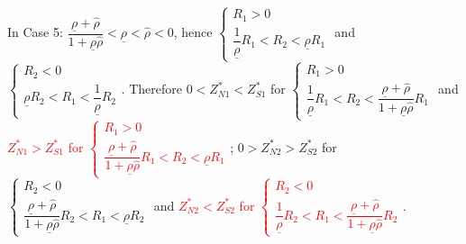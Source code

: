 \documentclass[10pt]{article}
\newcommand{\hhred}{\textcolor{red}}
\begin{document}
In Case 5: $ \dfrac{\underline{\rho} + {\hat \rho}}{1 + \underline{\rho} {\hat \rho}} < \underline{\rho} < {\hat \rho} < 0 $, hence $ \left\{ \begin{matrix} R_1 > 0 \\ \dfrac{1}{\underline{\rho}} R_1 < R_2 < \underline{\rho} R_1 \end{matrix} \right. $ and $ \left\{ \begin{matrix} R_2 < 0 \\ \underline{\rho} R_2 < R_1 < \dfrac{1}{\underline{\rho}} R_2 \end{matrix} \right. $.
Therefore $ 0 < Z_{N 1}^* < Z_{S 1}^* $ for $ \left\{ \begin{matrix} R_1 > 0 \\ \dfrac{1}{\underline{\rho}} R_1 < R_2 < \dfrac{\underline{\rho} + {\hat \rho}}{1 + \underline{\rho} {\hat \rho}} R_1 \end{matrix} \right. $ and \hhred{$ Z_{N 1}^* > Z_{S 1}^* $ for $ \left\{ \begin{matrix} R_1 > 0 \\ \dfrac{\underline{\rho} + {\hat \rho}}{1 + \underline{\rho} {\hat \rho}} R_1 < R_2 < \underline{\rho} R_1 \end{matrix} \right. $}; 
$ 0 > Z_{N 2}^* > Z_{S 2}^* $ for $ \left\{ \begin{matrix} R_2 < 0 \\ \dfrac{\underline{\rho} + {\hat \rho}}{1 + \underline{\rho} {\hat \rho}} R_2 < R_1 < \underline{\rho} R_2 \end{matrix} \right. $ and \hhred{$ Z_{N 2}^* < Z_{S 2}^* $ for $ \left\{ \begin{matrix} R_2 < 0 \\ \dfrac{1}{\underline{\rho}} R_2 < R_1 < \dfrac{\underline{\rho} + {\hat \rho}}{1 + \underline{\rho} {\hat \rho}} R_2 \end{matrix} \right. $}.
\end{document}
